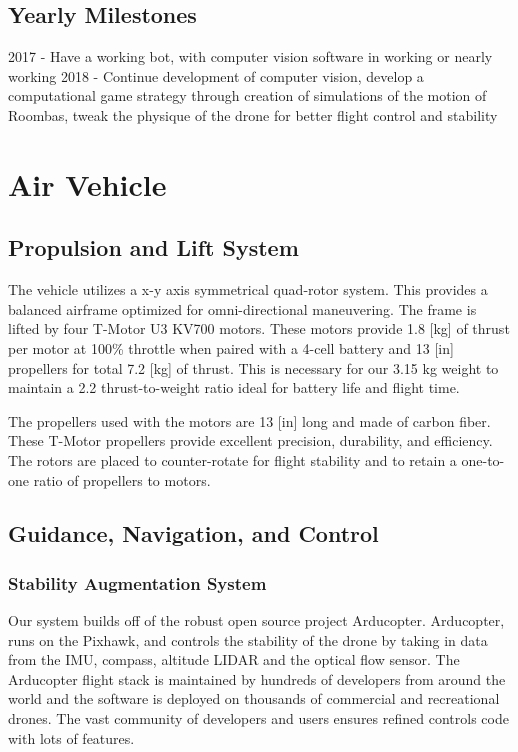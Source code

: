 \documentclass[12pt,letterpaper]{article}
\begin{document}
	\subsection{Yearly Milestones}
	2017 - Have a working bot, with computer vision software in working or nearly working
	2018 - Continue development of computer vision, develop a computational game strategy through creation of simulations of the motion of Roombas, tweak the physique of the drone for better flight control and stability


\section*{Air Vehicle}
	\subsection*{Propulsion and Lift System}
			The vehicle utilizes a x-y axis symmetrical quad-rotor system. This provides a balanced airframe optimized for omni-directional maneuvering. The frame is lifted by four T-Motor U3 KV700 motors. These motors provide 1.8 [kg] of thrust per motor at 100\% throttle when paired with a 4-cell battery and 13 [in] propellers for total 7.2 [kg] of thrust. This is necessary for our 3.15 kg weight to maintain a 2.2 thrust-to-weight ratio ideal for battery life and flight time.

			The propellers used with the motors are 13 [in] long and made of carbon fiber. These T-Motor propellers provide excellent precision, durability, and efficiency. The rotors are placed to counter-rotate for flight stability and to retain a one-to-one ratio of propellers to motors.


	\subsection*{Guidance, Navigation, and Control}
		\subsubsection*{Stability Augmentation System}
			Our system builds off of the robust open source project Arducopter. Arducopter, runs on the Pixhawk, and controls the stability of the drone by taking in data from the IMU, compass, altitude LIDAR and the optical flow sensor. The Arducopter flight stack is maintained by hundreds of developers from around the world and the software is deployed on thousands of commercial and recreational drones. The vast community of developers and users ensures refined controls code with lots of features.
\end{document}

